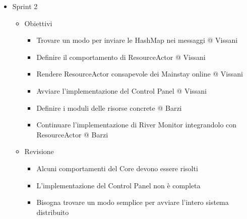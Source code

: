 \documentclass{scrartcl}
\begin{document}
\begin{itemize}
    \item Sprint 2
          \begin{itemize}
              \item Obiettivi
                    \begin{itemize}
                        \item Trovare un modo per inviare le HashMap nei messaggi @ Vissani
                        \item Definire il comportamento di ResourceActor @ Vissani
                        \item Rendere ResourceActor consapevole dei Mainstay online @ Vissani
                        \item Avviare l'implementazione del Control Panel @ Vissani
                        \item Definire i moduli delle risorse concrete @ Barzi
                        \item Continuare l'implementazione di River Monitor integrandolo con ResourceActor @ Barzi
                    \end{itemize}
              \item Revisione
                    \begin{itemize}
                        \item Alcuni comportamenti del Core devono essere risolti
                        \item L'implementazione del Control Panel non è completa
                        \item Bisogna trovare un modo semplice per avviare l'intero sistema distribuito
                    \end{itemize}
          \end{itemize}
\end{itemize}
\end{document}
